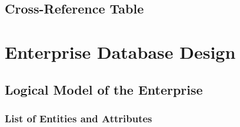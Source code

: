 \documentclass[11pt]{report}
\begin{document}
\section{Cross-Reference Table}

\chapter{Enterprise Database Design}

\section{Logical Model of the Enterprise}
\subsection{List of Entities and Attributes}
\end{document}
